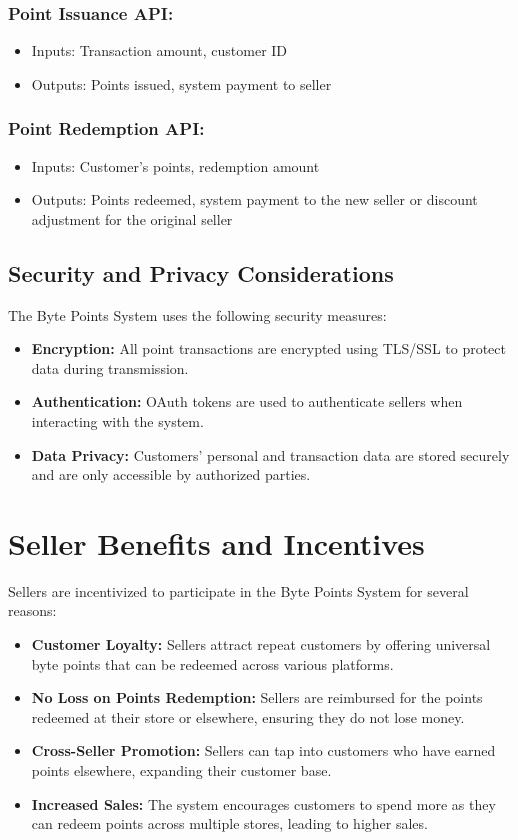 \documentclass[a4paper,12pt]{article}
\begin{document}
\subsubsection{Point Issuance API:}
\begin{itemize}
    \item Inputs: Transaction amount, customer ID
    \item Outputs: Points issued, system payment to seller
\end{itemize}

\subsubsection{Point Redemption API:}
\begin{itemize}
    \item Inputs: Customer's points, redemption amount
    \item Outputs: Points redeemed, system payment to the new seller or discount adjustment for the original seller
\end{itemize}

\subsection{Security and Privacy Considerations}
The Byte Points System uses the following security measures:
\begin{itemize}
    \item \textbf{Encryption:} All point transactions are encrypted using TLS/SSL to protect data during transmission.
    \item \textbf{Authentication:} OAuth tokens are used to authenticate sellers when interacting with the system.
    \item \textbf{Data Privacy:} Customers’ personal and transaction data are stored securely and are only accessible by authorized parties.
\end{itemize}

\section{Seller Benefits and Incentives}
Sellers are incentivized to participate in the Byte Points System for several reasons:

\begin{itemize}
    \item \textbf{Customer Loyalty:} Sellers attract repeat customers by offering universal byte points that can be redeemed across various platforms.
    \item \textbf{No Loss on Points Redemption:} Sellers are reimbursed for the points redeemed at their store or elsewhere, ensuring they do not lose money.
    \item \textbf{Cross-Seller Promotion:} Sellers can tap into customers who have earned points elsewhere, expanding their customer base.
    \item \textbf{Increased Sales:} The system encourages customers to spend more as they can redeem points across multiple stores, leading to higher sales.
\end{itemize}
\end{document}
